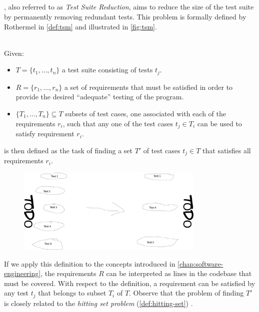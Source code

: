 
\subsection{\tsm{}}
\label{ssec:tsm}
\tsm{}, also referred to as \emph{Test Suite Reduction}, aims to reduce the size of the test suite by permanently removing redundant tests. This problem is formally defined by Rothermel in \autoref{def:tsm} \cite{10.1002/stv.430} and illustrated in \autoref{fig:tsm}. 

\begin{definition}[\tsm{}]
\label{def:tsm}
\mbox{}\\Given:
\begin{itemize}
	\item $T = \{t_1, \dots, t_n\}$ a test suite consisting of tests $t_j$.
	\item $R = \{r_1, \dots, r_n\}$ a set of requirements that must be satisfied in order to provide the desired ``adequate'' testing of the program.
	\item $\{T_1, \dots, T_n\} \subseteq T$ subsets of test cases, one associated with each of the requirements $r_i$, such that any one of the test cases $t_j \in T_i$ can be used to satisfy requirement $r_i$.
\end{itemize}

\noindent \tsm{} is then defined as the task of finding a set $T'$ of test cases $t_j \in T$ that satisfies all requirements $r_i$.
\end{definition}


\begin{figure}[htbp!]
	\centering
	\includegraphics[width=0.8\textwidth]{assets/approach-tsm.pdf}
	\caption{\tsm{}}
	\label{fig:tsm}
\end{figure}

\noindent If we apply this definition to the concepts introduced in \autoref{chap:software-engineering}, the requirements $R$ can be interpreted as lines in the codebase that must be covered. With respect to the definition, a requirement can be satisfied by any test $t_j$ that belongs to subset $T_i$ of $T$. Observe that the problem of finding $T'$ is closely related to the \emph{hitting set problem} (\autoref{def:hitting-set}) \cite{10.1002/stv.430}.

